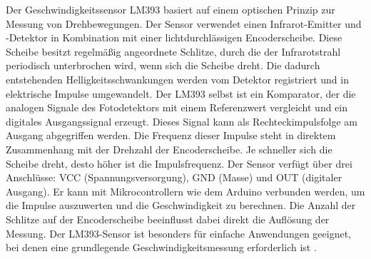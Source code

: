 \documentclass[25pt,a0paper, portrait]{tikzposter}
\begin{document}
\begin{columns}
{		
		{
			Der Geschwindigkeitssensor LM393 basiert auf einem optischen Prinzip zur Messung von Drehbewegungen. Der Sensor verwendet einen Infrarot-Emitter und -Detektor in Kombination mit einer lichtdurchlässigen Encoderscheibe. Diese Scheibe besitzt regelmäßig angeordnete Schlitze, durch die der Infrarotstrahl periodisch unterbrochen wird, wenn sich die Scheibe dreht. Die dadurch entstehenden Helligkeitsschwankungen werden vom Detektor registriert und in elektrische Impulse umgewandelt.
			Der LM393 selbst ist ein Komparator, der die analogen Signale des Fotodetektors mit einem Referenzwert vergleicht und ein digitales Ausgangssignal erzeugt. Dieses Signal kann als Rechteckimpulsfolge am Ausgang abgegriffen werden. Die Frequenz dieser Impulse steht in direktem Zusammenhang mit der Drehzahl der Encoderscheibe. Je schneller sich die Scheibe dreht, desto höher ist die Impulsfrequenz.
			Der Sensor verfügt über drei Anschlüsse: VCC (Spannungsversorgung), GND (Masse) und OUT (digitaler Ausgang). Er kann mit Mikrocontrollern wie dem Arduino verbunden werden, um die Impulse auszuwerten und die Geschwindigkeit zu berechnen. Die Anzahl der Schlitze auf der Encoderscheibe beeinflusst dabei direkt die Auflösung der Messung. Der LM393-Sensor ist besonders für einfache Anwendungen geeignet, bei denen eine grundlegende Geschwindigkeitsmessung erforderlich ist
			.
		}
	}
\end{columns}
\end{document}
